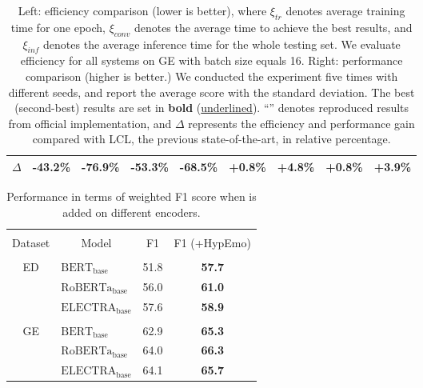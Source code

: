 \begin{table}[t]
\begin{tabular}{c c c c c | c c c c }
          \multicolumn{1}{c}{$\Delta$} & -43.2\% & -76.9\% & -53.3\% & -68.5\% & +0.8\% & +4.8\% & \multicolumn{1}{c}{+0.8\%} & \multicolumn{1}{c}{+3.9\%}  \\
         \toprule

    \end{tabular}
	 \caption{Left: efficiency comparison (lower is better), where $\xi_{tr}$ denotes average training time for one epoch, $\xi_{conv}$ denotes the average time to achieve the best results, and $\xi_{inf}$ denotes the average inference time for the whole testing set. We evaluate efficiency for all systems on GE with batch size equals 16. Right: performance comparison (higher is better.) We conducted the experiment five times with different seeds, and report the average score with the standard deviation. The best (second-best) results are set in \textbf{bold} (\underline{underlined}). ``\dag'' denotes reproduced results from official implementation, and $\Delta$ represents the efficiency and performance gain compared with LCL, the previous state-of-the-art, in relative percentage.}
    \label{tab:main_results}
\end{table}

\begin{table}[ht!]
\centering
\small
\begin{tabular}{clcc}
\bottomrule\\[-1em]
\multicolumn{1}{c}{Dataset} & \multicolumn{1}{c}{Model}   & \multicolumn{1}{c}{F1} & \multicolumn{1}{c}{F1 (+HypEmo)} \\\\[-1em] \toprule
\multirow{3}{*}{ED}  & $\mathrm{BERT}_\mathrm{base}$    & 51.8                   & \textbf{57.7}                    \\
                     & $\mathrm{RoBERTa}_\mathrm{base}$ & 56.0                   & \textbf{61.0}                    \\
                     & $\mathrm{ELECTRA}_\mathrm{base}$ & 57.6                   & \textbf{58.9}                    \\ \hline \\[-1em]
\multirow{3}{*}{GE}  & $\mathrm{BERT}_\mathrm{base}$    & 62.9                   & \textbf{65.3}                    \\
                     & $\mathrm{RoBERTa}_\mathrm{base}$ & 64.0                   & \textbf{66.3}                    \\
                     & $\mathrm{ELECTRA}_\mathrm{base}$ & 64.1                   & \textbf{65.7}                    \\ \toprule
\end{tabular}
\caption{Performance in terms of weighted F1 score when \wsmodelname is added on different encoders.}
\label{tab:encoder_analysis}
\end{table}


